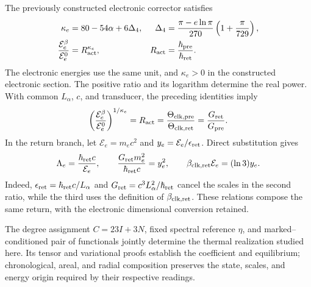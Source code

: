 The previously constructed electronic corrector satisfies
\begin{align}
 \kappa_e&=80-54\alpha+6\Delta_4,&
 \Delta_4&=\frac{\pi-e\ln\pi}{270}
                 \left(1+\frac\pi{729}\right),\nonumber\\
 \frac{\mathcal E_e^{\beta}}{\mathcal E_e^0}
 &=R_{\rm act}^{\kappa_e},&
 R_{\rm act}&=\frac{\hbar_{\rm pre}}{\hbar_{\rm ret}}.
 \label{eq:ii-ter27-electron-return}
\end{align}
The electronic energies use the same unit, and $\kappa_e>0$ in the
constructed electronic section. The positive ratio and its
logarithm determine the real power. With common $L_\alpha$, $c$, and
transducer, the preceding identities imply
\begin{equation}
 \left(\frac{\mathcal E_e^{\beta}}{\mathcal E_e^0}\right)^{1/\kappa_e}
 =R_{\rm act}
 =\frac{\Theta_{{\rm clk,pre}}}{\Theta_{{\rm clk,ret}}}
 =\frac{G_{\rm ret}}{G_{\rm pre}}.
 \label{eq:ii-ter27-return-ratios}
\end{equation}
In the return branch, let $\mathcal E_e=m_ec^2$ and
$y_e=\mathcal E_e/\epsilon_{\rm ret}$. Direct substitution gives
\begin{equation}
 \Lambda_e=\frac{\hbar_{\rm ret}c}{\mathcal E_e},\qquad
 \frac{G_{\rm ret}m_e^2}{\hbar_{\rm ret}c}=y_e^2,\qquad
 \beta_{{\rm clk,ret}}\mathcal E_e=(\ln3)y_e.
 \label{eq:ii-ter27-electron-gravity}
\end{equation}
Indeed, $\epsilon_{\rm ret}=\hbar_{\rm ret}c/L_\alpha$ and
$G_{\rm ret}=c^3L_\alpha^2/\hbar_{\rm ret}$ cancel the scales in
the second ratio, while the third uses the definition of
$\beta_{{\rm clk,ret}}$. These relations compose the same return, with
the electronic dimensional conversion retained.

The degree assignment $C=23I+3N$, fixed spectral reference $\eta$,
and marked--conditioned pair of functionals jointly determine the
thermal realization studied here. Its tensor and variational proofs
establish the coefficient and equilibrium; chronological, areal, and
radial composition preserves the state, scales, and energy origin
required by their respective readings.
